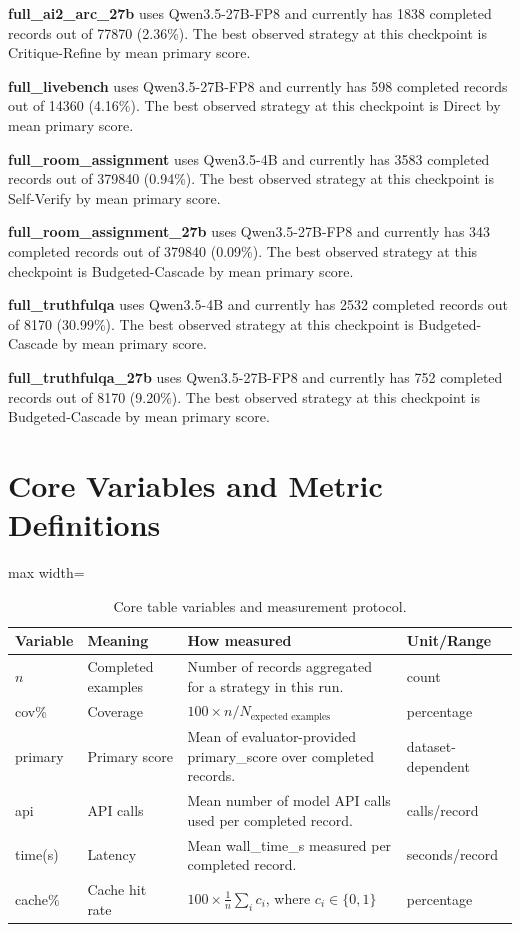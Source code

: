 \documentclass[10pt,twocolumn]{article}
\begin{document}
\textbf{full\_ai2\_arc\_27b} uses Qwen3.5-27B-FP8 and currently has 1838 completed records out of 77870 (2.36\%). The best observed strategy at this checkpoint is Critique-Refine by mean primary score.

\textbf{full\_livebench} uses Qwen3.5-27B-FP8 and currently has 598 completed records out of 14360 (4.16\%). The best observed strategy at this checkpoint is Direct by mean primary score.

\textbf{full\_room\_assignment} uses Qwen3.5-4B and currently has 3583 completed records out of 379840 (0.94\%). The best observed strategy at this checkpoint is Self-Verify by mean primary score.

\textbf{full\_room\_assignment\_27b} uses Qwen3.5-27B-FP8 and currently has 343 completed records out of 379840 (0.09\%). The best observed strategy at this checkpoint is Budgeted-Cascade by mean primary score.

\textbf{full\_truthfulqa} uses Qwen3.5-4B and currently has 2532 completed records out of 8170 (30.99\%). The best observed strategy at this checkpoint is Budgeted-Cascade by mean primary score.

\textbf{full\_truthfulqa\_27b} uses Qwen3.5-27B-FP8 and currently has 752 completed records out of 8170 (9.20\%). The best observed strategy at this checkpoint is Budgeted-Cascade by mean primary score.
\section*{Core Variables and Metric Definitions}
\begin{table}[t]
\centering
\caption{Core table variables and measurement protocol.}
\label{tab:variables}
\begin{adjustbox}{max width=\textwidth}
\begin{tabular}{llll}
\toprule
Variable & Meaning & How measured & Unit/Range \\
\midrule
$n$ & Completed examples & Number of records aggregated for a strategy in this run. & count \\
cov\% & Coverage & $100 \times n / N_{\text{expected examples}}$ & percentage \\
primary & Primary score & Mean of evaluator-provided primary\_score over completed records. & dataset-dependent \\
api & API calls & Mean number of model API calls used per completed record. & calls/record \\
time(s) & Latency & Mean wall\_time\_s measured per completed record. & seconds/record \\
cache\% & Cache hit rate & $100 \times \frac{1}{n}\sum_i c_i$, where $c_i \in \{0,1\}$ & percentage \\
\bottomrule
\end{tabular}
\end{adjustbox}
\end{table}
\end{document}
